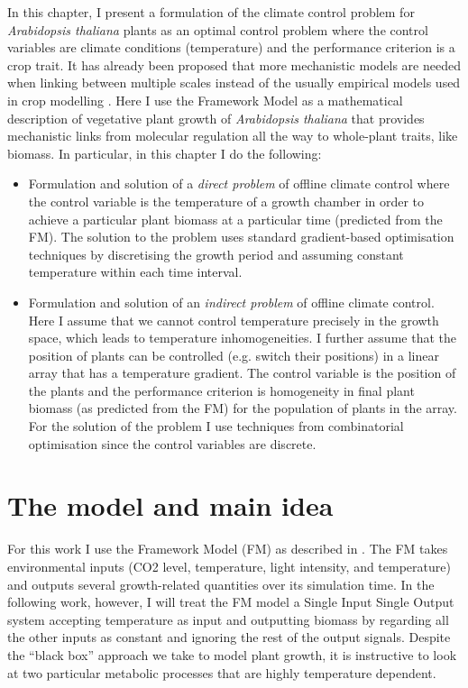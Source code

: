 In this chapter, I present a formulation of the climate control problem for
\textit{Arabidopsis thaliana} plants as an optimal control problem
\citep{kirk_optimal_2012} where the control variables are climate conditions
(temperature) and the performance criterion is a crop trait. It has already been
proposed that more mechanistic models are needed when linking between multiple
scales instead of the usually empirical models used in crop modelling
\citep{yin_role_2004, yin_modelling_2010}. Here I use the Framework Model
\citep[FMv1;][]{chew2014multiscale} as a mathematical description of vegetative
plant growth of \textit{Arabidopsis thaliana} that provides mechanistic links
from molecular regulation all the way to whole-plant traits, like biomass. In
particular, in this chapter I do the following:
\begin{itemize}
\item Formulation and solution of a \textit{direct problem} of offline climate
  control where the control variable is the temperature of a growth chamber in
  order to achieve a particular plant biomass at a particular time (predicted
  from the FM). The solution to the problem uses standard gradient-based
  optimisation techniques by discretising the growth period and assuming
  constant temperature within each time interval.
\item Formulation and solution of an \textit{indirect problem} of offline
  climate control. Here I assume that we cannot control temperature precisely in
  the growth space, which leads to temperature inhomogeneities. I further assume
  that the position of plants can be controlled (e.g. switch their positions) in
  a linear array that has a temperature gradient. The control variable is the
  position of the plants and the performance criterion is homogeneity in final
  plant biomass (as predicted from the FM) for the population of plants in the
  array. For the solution of the problem I use techniques from combinatorial
  optimisation since the control variables are discrete.
\end{itemize}

\section{The model and main idea}
For this work I use the Framework Model (FM) as described in
\citet{chew2014multiscale}. The FM takes environmental inputs (CO2 level,
temperature, light intensity, and temperature) and outputs several
growth-related quantities over its simulation time. In the following work,
however, I will treat the FM model a Single Input Single Output system
accepting temperature as input and outputting biomass by regarding all the other
inputs as constant and ignoring the rest of the output signals. Despite the
``black box'' approach we take to model plant growth, it is instructive to look
at two particular metabolic processes that are highly temperature dependent.

